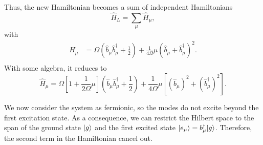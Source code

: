 Thus, the new Hamiltonian becomes a sum of independent Hamiltonians
\begin{equation}
    \hat H_L = \sum_\mu \hat H_\mu,
\end{equation}
with
\begin{equation}
    \begin{split}
        \hat H_\mu &= \Omega \left(\hat b_\mu\hat b^\dagger_\mu + \frac{1}{2}\right) + \frac{1}{4\Omega}\mu\left(\hat b_\mu +\hat b_\mu^\dagger\right)^2.\\
    \end{split}
\end{equation}
With some algebra, it reduces to 
\begin{equation}
    \hat H_\mu = \Omega \left[ 1 + \frac{1}{2\Omega}\mu\right] \left(\hat b_\mu\hat b^\dagger_\mu + \frac{1}{2}\right) + \frac{1}{4\Omega}\mu\left[\left(\hat b_\mu\right)^2 +\left(\hat b_\mu^\dagger\right)^2 \right].
\end{equation}


We now consider the system as fermionic, so the modes do not excite beyond the first excitation state. As a consequence, we can restrict the Hilbert space to the span of the ground state $\lvert g\rangle$ and the first excited state $\lvert e_\mu\rangle=b_\mu^\dagger\lvert g\rangle$. Therefore, the second term in the Hamiltonian cancel out. 

